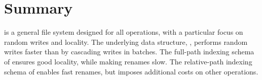 \section{Summary}

\betrfs is a general file system designed for all operations, with a particular
focus on random writes and locality.
The underlying data structure, \bets, performs random writes faster than \btrees
by cascading writes in batches.
The full-path indexing schema of \betrfsOne ensures good locality, while making
renames slow.
The relative-path indexing schema of \betrfsTwo enables fast renames,
but imposes additional costs on other operations.


